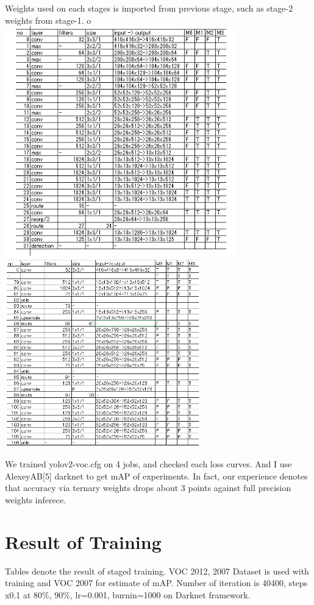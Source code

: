 \documentclass[twocolumn]{article}
\begin{document}
Weights used on each stages is imported from previous stage, such as stage-2 weights from stage-1.
o
\includegraphics[width=10cm]{yolov2-voc_Stages.png}
\includegraphics[width=8.5cm]{yolov3-voc_Stages.png}

We trained yolov2-voc.cfg on 4 jobs, and checked each loss curves.
And I use AlexeyAB[5] darknet to get mAP of experiments.
In fact, our experience denotes that accuracy via ternary weights drops about 3 points against full precision weights inferece.

\section{Result of Training}

Tables denote the result of staged training.
VOC 2012, 2007 Dataset is used with training and VOC 2007 for estimate of mAP.
Number of iteration is 40400, steps x0.1 at 80\%, 90\%, lr=0.001, burnin=1000 on Darknet framework.
\end{document}
